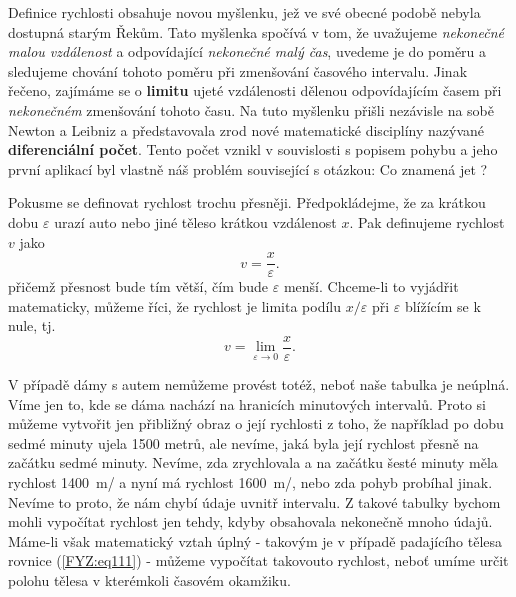     Definice rychlosti obsahuje novou myšlenku, jež ve své obe\-cné podobě nebyla dostupná starým 
    Řekům. Tato myšlenka spočívá v tom, že uvažujeme \emph{nekonečné malou vzdálenost} a 
    odpovídající \emph{nekonečné malý čas}, uvedeme je do poměru a sledujeme chování tohoto poměru 
    při zmenšování časového intervalu. Jinak řečeno, zajímáme se o \textbf{limitu} ujeté 
    vzdálenosti dělenou odpovídajícím časem při \emph{nekonečném} zmenšování tohoto času. Na tuto 
    myšlenku přišli nezávisle na sobě Newton a Leibniz a představovala zrod nové matematické 
    disciplíny nazývané \textbf{diferenciální počet}. Tento počet vznikl v souvislosti s popisem 
    pohybu a jeho první aplikací byl vlastně náš problém související s otázkou: Co znamená jet 
    ?

    Pokusme se definovat rychlost trochu přesněji. Předpokládejme, že za krátkou dobu 
    \(\varepsilon\) urazí auto nebo jiné těleso krátkou vzdálenost \(x\). Pak definujeme rychlost 
    \(v\) jako
    \begin{equation}\label{FYZ:eq113}
      v = \frac{x}{\varepsilon}.
    \end{equation}
    přičemž přesnost bude tím větší, čím bude \(\varepsilon\) menší. Chceme-li to vyjádřit 
    matematicky, můžeme říci, že rychlost je limita podílu \(x/\varepsilon\) při \(\varepsilon\) 
    blížícím se k nule, tj.
    \begin{equation}\label{FYZ:eq114}
      v = \lim_{\varepsilon\to 0}{\frac{x}{\varepsilon}}.
    \end{equation}
    
    V případě dámy s autem nemůžeme provést totéž, neboť naše tabulka je neúplná. Víme jen to, kde 
    se dáma nachází na hranicích minutových intervalů. Proto si můžeme vytvořit jen přibližný obraz 
    o její rychlosti z toho, že například po dobu sedmé minuty ujela \num{1500} metrů, ale nevíme, 
    jaká byla její rychlost přesně na začátku sedmé minuty. Nevíme, zda zrychlovala a na začátku 
    šesté minuty měla rychlost \SI{1400}{\m/\min} a nyní má rychlost \SI{1600}{\m/\min}, nebo zda 
    pohyb probíhal jinak. Nevíme to proto, že nám chybí údaje uvnitř intervalu. Z takové tabulky 
    bychom mohli vypočítat rychlost jen tehdy, kdyby obsahovala nekonečně mnoho údajů. Máme-li však 
    matematický vztah úplný - takovým je v případě padajícího tělesa rovnice (\ref{FYZ:eq111}) - 
    můžeme vypočítat takovouto rychlost, neboť umíme určit polohu tělesa v kterémkoli časovém 
    okamžiku.
    
